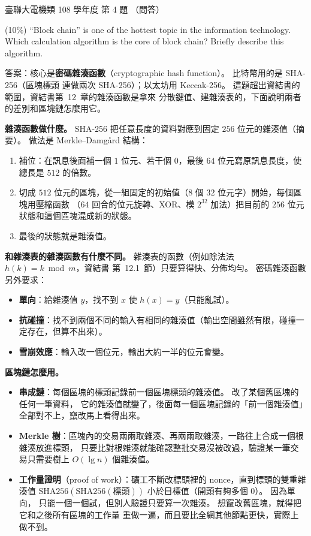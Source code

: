 \begin{pastexam}[label={px:ust-108-ee-ds-04}]{臺聯大電機類 108 學年度 第 4 題}
（問答）

(10\%) ``Block chain'' is one of the hottest topic in the information technology. Which calculation
algorithm is the core of block chain? Briefly describe this algorithm.
\end{pastexam}

\begin{pastsoln}
答案：核心是\textbf{密碼雜湊函數}（cryptographic hash function）。 比特幣用的是 SHA-256（區塊標頭
連做兩次 SHA-256）；以太坊用 Keccak-256。 這題超出資結書的範圍，資結書第~12~章的雜湊函數是拿來
分散鍵值、建雜湊表的，下面說明兩者的差別和區塊鏈怎麼用它。

\textbf{雜湊函數做什麼。} SHA-256 把任意長度的資料對應到固定 $256$ 位元的雜湊值（摘要）。
做法是 Merkle--Damgård 結構：
\begin{enumerate}
\item 補位：在訊息後面補一個 $1$ 位元、若干個 $0$，最後 $64$ 位元寫原訊息長度，使總長是 $512$ 的倍數。
\item 切成 $512$ 位元的區塊，從一組固定的初始值（$8$ 個 $32$ 位元字）開始，每個區塊用壓縮函數
（$64$ 回合的位元旋轉、XOR、模 $2^{32}$ 加法）把目前的 $256$ 位元狀態和這個區塊混成新的狀態。
\item 最後的狀態就是雜湊值。
\end{enumerate}

\textbf{和雜湊表的雜湊函數有什麼不同。} 雜湊表的函數（例如除法法 $h(k) = k \bmod m$，資結書
第~12.1~節）只要算得快、分佈均勻。 密碼雜湊函數另外要求：
\begin{itemize}
\item \textbf{單向}：給雜湊值 $y$，找不到 $x$ 使 $h(x) = y$（只能亂試）。
\item \textbf{抗碰撞}：找不到兩個不同的輸入有相同的雜湊值（輸出空間雖然有限，碰撞一定存在，但算不出來）。
\item \textbf{雪崩效應}：輸入改一個位元，輸出大約一半的位元會變。
\end{itemize}

\textbf{區塊鏈怎麼用。}
\begin{itemize}
\item \textbf{串成鏈}：每個區塊的標頭記錄前一個區塊標頭的雜湊值。 改了某個舊區塊的任何一筆資料，
它的雜湊值就變了，後面每一個區塊記錄的「前一個雜湊值」全部對不上，竄改馬上看得出來。
\item \textbf{Merkle 樹}：區塊內的交易兩兩取雜湊、再兩兩取雜湊，一路往上合成一個根雜湊放進標頭，
只要比對根雜湊就能確認整批交易沒被改過，驗證某一筆交易只需要樹上 $O(\lg n)$ 個雜湊值。
\item \textbf{工作量證明}（proof of work）：礦工不斷改標頭裡的 nonce，直到標頭的雙重雜湊值
$\mathrm{SHA256}(\mathrm{SHA256}(\text{標頭}))$ 小於目標值（開頭有夠多個 $0$）。 因為單向，
只能一個一個試，但別人驗證只要算一次雜湊。 想竄改舊區塊，就得把它和之後所有區塊的工作量
重做一遍，而且要比全網其他節點更快，實際上做不到。
\end{itemize}
\end{pastsoln}
